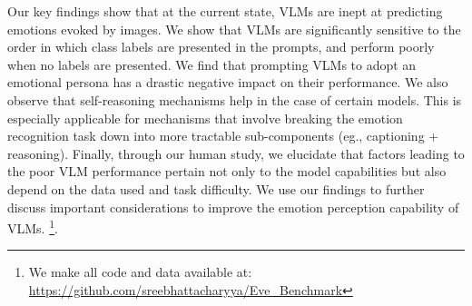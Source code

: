Our key findings show that at the current state, VLMs are inept at predicting emotions evoked by images. We show that VLMs are significantly sensitive to the order in which class labels are presented in the prompts, and perform poorly when no labels are presented. We find that prompting VLMs to adopt an emotional persona has a drastic negative impact on their performance. We also observe that self-reasoning mechanisms help in the case of certain models. This is especially applicable for mechanisms that involve breaking the emotion recognition task down into more tractable sub-components (eg., captioning + reasoning). Finally, through our human study, we elucidate that factors leading to the poor VLM performance pertain not only to the model capabilities but also depend on the data used and task difficulty. We use our findings to further discuss important considerations to improve the emotion perception capability of VLMs. \footnote{We make all code and data available at: \url{https://github.com/sreebhattacharyya/Eve_Benchmark}}.



